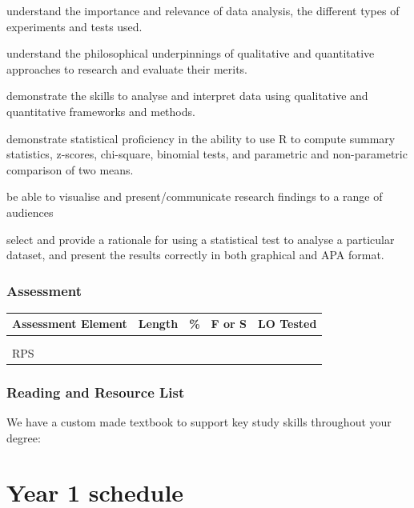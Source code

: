 \documentclass[
  11pt,
  letterpaper,
  oneside,
  open=any]{scrbook}
\begin{document}
understand the importance and relevance of data analysis, the different
types of experiments and tests used.

understand the philosophical underpinnings of qualitative and
quantitative approaches to research and evaluate their merits.

demonstrate the skills to analyse and interpret data using qualitative
and quantitative frameworks and methods.

demonstrate statistical proficiency in the ability to use R to compute
summary statistics, z-scores, chi-square, binomial tests, and parametric
and non-parametric comparison of two means.

be able to visualise and present/communicate research findings to a
range of audiences

select and provide a rationale for using a statistical test to analyse a
particular dataset, and present the results correctly in both graphical
and APA format.

\hypertarget{assessment}{%
\subsection{Assessment}\label{assessment}}

\begin{longtable}[]{@{}lllll@{}}
\toprule()
Assessment Element & Length & \% & F or S & LO Tested \\
\midrule()
\endhead
& & & & \\
& & & & \\
RPS & & & & \\
\bottomrule()
\end{longtable}

\hypertarget{reading-and-resource-list}{%
\subsection{Reading and Resource List}\label{reading-and-resource-list}}

We have a custom made textbook to support key study skills throughout
your degree:

\hypertarget{year-1-schedule}{%
\chapter{Year 1 schedule}\label{year-1-schedule}}
\end{document}
